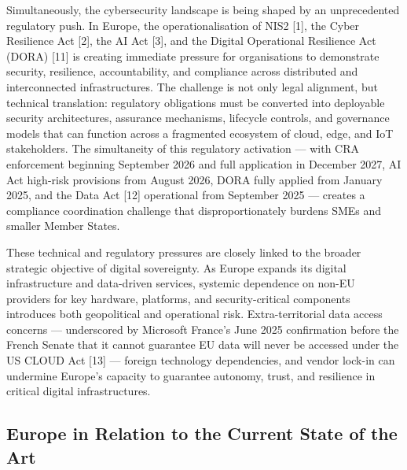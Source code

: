 \documentclass{ieeeaccess}
\begin{document}
Simultaneously, the cybersecurity landscape is being shaped by an
unprecedented regulatory push. In Europe, the operationalisation of NIS2
{[}1{]}, the Cyber Resilience Act {[}2{]}, the AI Act {[}3{]}, and the
Digital Operational Resilience Act (DORA) {[}11{]} is creating immediate
pressure for organisations to demonstrate security, resilience,
accountability, and compliance across distributed and interconnected
infrastructures. The challenge is not only legal alignment, but
technical translation: regulatory obligations must be converted into
deployable security architectures, assurance mechanisms, lifecycle
controls, and governance models that can function across a fragmented
ecosystem of cloud, edge, and IoT stakeholders. The simultaneity of this
regulatory activation --- with CRA enforcement beginning September 2026
and full application in December 2027, AI Act high-risk provisions from
August 2026, DORA fully applied from January 2025, and the Data Act
{[}12{]} operational from September 2025 --- creates a compliance
coordination challenge that disproportionately burdens SMEs and smaller
Member States.

These technical and regulatory pressures are closely linked to the
broader strategic objective of digital sovereignty. As Europe expands
its digital infrastructure and data-driven services, systemic dependence
on non-EU providers for key hardware, platforms, and security-critical
components introduces both geopolitical and operational risk.
Extra-territorial data access concerns --- underscored by Microsoft
France's June 2025 confirmation before the French Senate that it cannot
guarantee EU data will never be accessed under the US CLOUD Act {[}13{]}
--- foreign technology dependencies, and vendor lock-in can undermine
Europe's capacity to guarantee autonomy, trust, and resilience in
critical digital infrastructures.

\subsection{Europe in Relation to the Current State of the
Art}\label{europe-in-relation-to-the-current-state-of-the-art}
\end{document}
